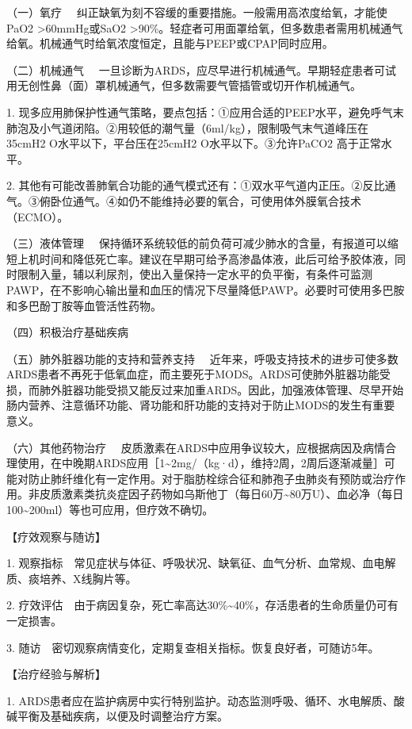 {（一）氧疗}
　纠正缺氧为刻不容缓的重要措施。一般需用高浓度给氧，才能使PaO{2}
\textgreater{}60mmHg或SaO{2}
\textgreater{}90\%。轻症者可用面罩给氧，但多数患者需用机械通气给氧。机械通气时给氧浓度恒定，且能与PEEP或CPAP同时应用。

{（二）机械通气}
　一旦诊断为ARDS，应尽早进行机械通气。早期轻症患者可试用无创性鼻（面）罩机械通气，但多数需要气管插管或切开作机械通气。

1.
现多应用肺保护性通气策略，要点包括：①应用合适的PEEP水平，避免呼气末肺泡及小气道闭陷。②用较低的潮气量（6ml/kg），限制吸气末气道峰压在35cmH{2}
O水平以下，平台压在25cmH{2} O水平以下。③允许PaCO{2} 高于正常水平。

2.
其他有可能改善肺氧合功能的通气模式还有：①双水平气道内正压。②反比通气。③俯卧位通气。④如仍不能维持必要的氧合，可使用体外膜氧合技术（ECMO）。

{（三）液体管理}
　保持循环系统较低的前负荷可减少肺水的含量，有报道可以缩短上机时间和降低死亡率。建议在早期可给予高渗晶体液，此后可给予胶体液，同时限制入量，辅以利尿剂，使出入量保持一定水平的负平衡，有条件可监测PAWP，在不影响心输出量和血压的情况下尽量降低PAWP。必要时可使用多巴胺和多巴酚丁胺等血管活性药物。

{（四）积极治疗基础疾病}

{（五）肺外脏器功能的支持和营养支持}
　近年来，呼吸支持技术的进步可使多数ARDS患者不再死于低氧血症，而主要死于MODS。ARDS可使肺外脏器功能受损，而肺外脏器功能受损又能反过来加重ARDS。因此，加强液体管理、尽早开始肠内营养、注意循环功能、肾功能和肝功能的支持对于防止MODS的发生有重要意义。

{（六）其他药物治疗}
　皮质激素在ARDS中应用争议较大，应根据病因及病情合理使用，在中晚期ARDS应用［1\textasciitilde{}2mg/（kg·d），维持2周，2周后逐渐减量］可能对防止肺纤维化有一定作用。对于脂肪栓综合征和肺孢子虫肺炎有预防或治疗作用。非皮质激素类抗炎症因子药物如乌斯他丁（每日60万\textasciitilde{}80万U）、血必净（每日100\textasciitilde{}200ml）等也可应用，但疗效不确切。

【疗效观察与随访】

1.
观察指标　常见症状与体征、呼吸状况、缺氧征、血气分析、血常规、血电解质、痰培养、X线胸片等。

2.
疗效评估　由于病因复杂，死亡率高达30\%\textasciitilde{}40\%，存活患者的生命质量仍可有一定损害。

3. 随访　密切观察病情变化，定期复查相关指标。恢复良好者，可随访5年。

【治疗经验与解析】

1.
ARDS患者应在监护病房中实行特别监护。动态监测呼吸、循环、水电解质、酸碱平衡及基础疾病，以便及时调整治疗方案。


